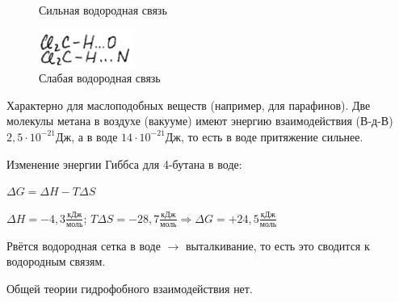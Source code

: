 \begin{lecture}
\begin{lecSection}
\begin{figure}[H]
\begin{minipage}[h]{0.2\linewidth}
		\caption{Сильная водородная связь}
	\end{minipage}
	\hfill
	\begin{minipage}[h]{0.2\linewidth}
		\centering\includegraphics[width=\linewidth]{lecture_07/new_pic4}
		\caption{Слабая водородная связь}
	\end{minipage}
	\hfill
	\end{figure}
	
	\end{lecSection}
	
	\begin{lecSection}
	\begin{flushleft}
	Характерно для маслоподобных веществ (например, для парафинов). Две молекулы метана в воздухе (вакууме) имеют энергию взаимодействия (В-д-В) $2,5 \cdot 10^{-21}\text{Дж}$, а в воде $14\cdot 10^{-21}\text{Дж}$, то есть в воде притяжение сильнее.
	\par Изменение энергии Гиббса для 4-бутана в воде:
	\par $\Delta G = \Delta H - T\Delta S$
	\par $\Delta H = -4,3\frac{\text{кДж}}{\text{моль}}$; $T\Delta S = -28,7\frac{\text{кДж}}{\text{моль}} \Rightarrow \Delta G = +24,5 \frac{\text{кДж}}{\text{моль}}$ 
	\par Рвётся водородная сетка в воде $\rightarrow$ выталкивание, то есть это сводится к водородным связям.
	\par Общей теории гидрофобного взаимодействия нет.
	\end{flushleft}
	\end{lecSection}
	

\end{lecture}
